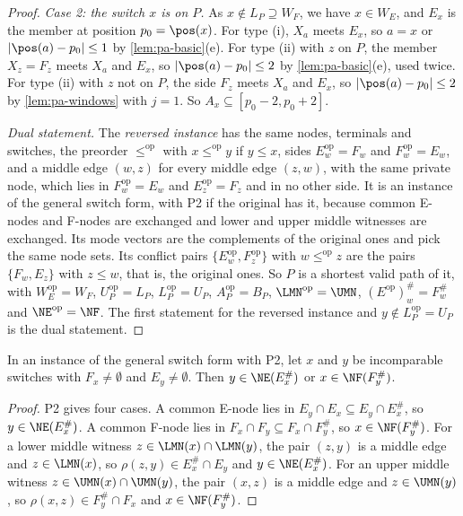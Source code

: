 \begin{proof}
\emph{Case 2: the switch $x$ is on $P$.}
As $x \notin L_P \supseteq W_F$, we have $x \in W_E$, and $E_x$ is the member at position $p_0 = \pos(x)$.
For type (i), $X_a$ meets $E_x$, so $a = x$ or $|\pos(a) - p_0| \leq 1$ by \cref{lem:pa-basic}(e).
For type (ii) with $z$ on $P$, the member $X_z = F_z$ meets $X_a$ and $E_x$, so $|\pos(a) - p_0| \leq 2$ by \cref{lem:pa-basic}(e), used twice.
For type (ii) with $z$ not on $P$, the side $F_z$ meets $X_a$ and $E_x$, so $|\pos(a) - p_0| \leq 2$ by \cref{lem:pa-windows} with $j = 1$.
So $A_x \subseteq [p_0 - 2, p_0 + 2]$.

\emph{Dual statement.}
The \emph{reversed instance} has the same nodes, terminals and switches, the preorder $\leq^{\mathrm{op}}$ with $x \leq^{\mathrm{op}} y$ if $y \leq x$, sides $E^{\mathrm{op}}_w = F_w$ and $F^{\mathrm{op}}_w = E_w$, and a middle edge $(w, z)$ for every middle edge $(z, w)$, with the same private node, which lies in $F^{\mathrm{op}}_w = E_w$ and $E^{\mathrm{op}}_z = F_z$ and in no other side.
It is an instance of the general switch form, with P2 if the original has it, because common E-nodes and F-nodes are exchanged and lower and upper middle witnesses are exchanged.
Its mode vectors are the complements of the original ones and pick the same node sets.
Its conflict pairs $\{E^{\mathrm{op}}_w, F^{\mathrm{op}}_z\}$ with $w \leq^{\mathrm{op}} z$ are the pairs $\{F_w, E_z\}$ with $z \leq w$, that is, the original ones.
So $P$ is a shortest valid path of it, with $W^{\mathrm{op}}_E = W_F$, $U^{\mathrm{op}}_P = L_P$, $L^{\mathrm{op}}_P = U_P$, $A^{\mathrm{op}}_P = B_P$, $\LMN^{\mathrm{op}} = \UMN$, $(E^{\mathrm{op}})^\#_w = F^\#_w$ and $\NE^{\mathrm{op}} = \NF$.
The first statement for the reversed instance and $y \notin L^{\mathrm{op}}_P = U_P$ is the dual statement.
\end{proof}

\begin{lemma}
\label{lem:pa-duality}
In an instance of the general switch form with P2, let $x$ and $y$ be incomparable switches with $F_x \neq \emptyset$ and $E_y \neq \emptyset$.
Then $y \in \NE(E^\#_x)$ or $x \in \NF(F^\#_y)$.
\end{lemma}

\begin{proof}
P2 gives four cases.
A common E-node lies in $E_y \cap E_x \subseteq E_y \cap E^\#_x$, so $y \in \NE(E^\#_x)$.
A common F-node lies in $F_x \cap F_y \subseteq F_x \cap F^\#_y$, so $x \in \NF(F^\#_y)$.
For a lower middle witness $z \in \LMN(x) \cap \LMN(y)$, the pair $(z, y)$ is a middle edge and $z \in \LMN(x)$, so $\rho(z, y) \in E^\#_x \cap E_y$ and $y \in \NE(E^\#_x)$.
For an upper middle witness $z \in \UMN(x) \cap \UMN(y)$, the pair $(x, z)$ is a middle edge and $z \in \UMN(y)$, so $\rho(x, z) \in F^\#_y \cap F_x$ and $x \in \NF(F^\#_y)$.
\end{proof}

